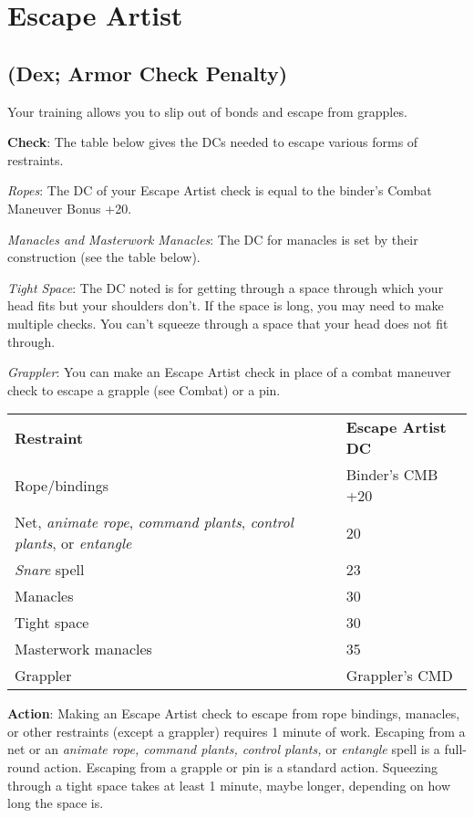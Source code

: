 \section{Escape Artist}

\label{f0}				
\subsection{(Dex; Armor Check Penalty)}

				
Your training allows you to slip out of bonds and escape from grapples.
				
\textbf{Check}: The table below gives the DCs needed to escape various forms of restraints.
				
\textit{Ropes}: The DC of your Escape Artist check is equal to the binder's Combat Maneuver Bonus +20.
				
\textit{Manacles and Masterwork Manacles}: The DC for manacles is set by their construction (see the table below).
				
\textit{Tight Space}: The DC noted is for getting through a space through which your head fits but your shoulders don't. If the space is long, you may need to make multiple checks. You can't squeeze through a space that your head does not fit through.
				
\textit{Grappler}: You can make an Escape Artist check in place of a combat maneuver check to escape a grapple (see Combat) or a pin.
\begin{table}
 \begin{tabular}{ll}
\textbf{Restraint} & \textbf{Escape Artist DC}\\
Rope/bindings & Binder's CMB +20\\
Net, \textit{animate rope}, \textit{command plants}, \textit{control plants}, or \textit{entangle} & 20\\
\textit{Snare} spell & 23\\
Manacles & 30\\
Tight space & 30\\
Masterwork manacles & 35\\
Grappler & Grappler's CMD\\
 \end{tabular}

\end{table}

				
\textbf{Action}: Making an Escape Artist check to escape from rope bindings, manacles, or other restraints (except a grappler) requires 1 minute of work. Escaping from a net or an \textit{animate rope, command plants, control plants, }or \textit{entangle }spell is a full-round action. Escaping from a grapple or pin is a standard action. Squeezing through a tight space takes at least 1 minute, maybe longer, depending on how long the space is.
				
